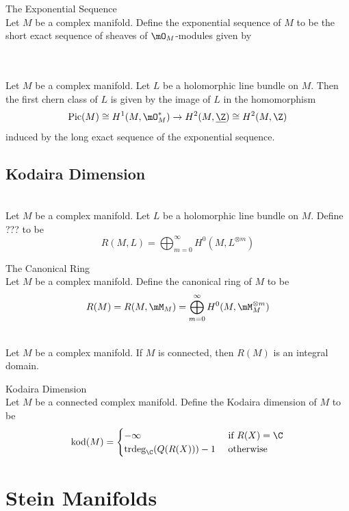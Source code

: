 \documentclass[a4paper]{article}
\begin{document}
\begin{defn}{The Exponential Sequence}{}\\
Let $M$ be a complex manifold. Define the exponential sequence of $M$ to be the short exact sequence of sheaves of $\mO_M$-modules given by \\
 \\
\end{defn}

\begin{prp}{}{}\\
Let $M$ be a complex manifold. Let $L$ be a holomorphic line bundle on $M$. Then the first chern class of $L$ is given by the image of $L$ in the homomorphism $$\text{Pic}(M)\cong H^1(M,\mO_M^\ast)\to H^2(M,\underline{\Z})\cong H^2(M,\Z)$$ induced by the long exact sequence of the exponential sequence. 
\end{prp}

\subsection{Kodaira Dimension}
\begin{defn}{}{}\\
Let $M$ be a complex manifold. Let $L$ be a holomorphic line bundle on $M$. Define ??? to be $$R(M,L)=\bigoplus_{m=0}^\infty H^0(M,L^{\otimes m})$$
\end{defn}

\begin{defn}{The Canonical Ring}{}\\
Let $M$ be a complex manifold. Define the canonical ring of $M$ to be $$R(M)=R(M,\mM_M)=\bigoplus_{m=0}^\infty H^0(M,\mM_M^{\otimes m})$$
\end{defn}

\begin{lmm}{}{}\\
Let $M$ be a complex manifold. If $M$ is connected, then $R(M)$ is an integral domain. 
\end{lmm}

\begin{defn}{Kodaira Dimension}{}\\
Let $M$ be a connected complex manifold. Define the Kodaira dimension of $M$ to be $$\text{kod}(M)=\begin{cases}
-\infty & \text{ if }R(X)=\C\\
\text{trdeg}_\C(Q(R(X)))-1 & \text{ otherwise }
\end{cases}$$
\end{defn}

\pagebreak
\section{Stein Manifolds}
\end{document}

